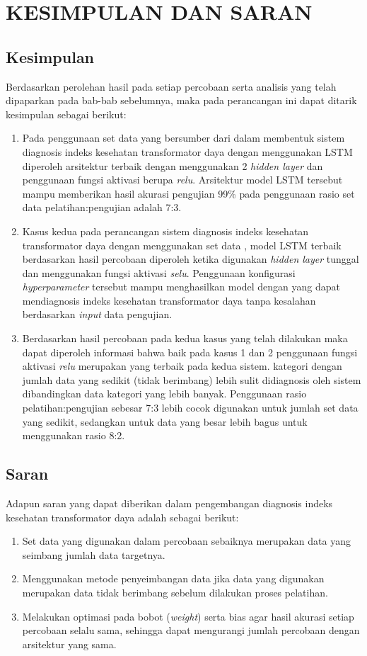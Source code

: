 \chapter{KESIMPULAN DAN SARAN}

\section{Kesimpulan}
Berdasarkan perolehan hasil pada setiap percobaan serta analisis yang telah dipaparkan pada bab-bab sebelumnya, maka pada perancangan ini dapat ditarik kesimpulan sebagai berikut:
\begin{enumerate}
	\item Pada penggunaan set data yang bersumber dari \cite{shah2016predict} dalam membentuk sistem diagnosis indeks kesehatan transformator daya dengan menggunakan LSTM diperoleh arsitektur terbaik dengan menggunakan 2 \textit{hidden layer} dan penggunaan fungsi aktivasi berupa \textit{relu}. Arsitektur model LSTM tersebut mampu memberikan hasil akurasi pengujian 99\% pada penggunaan rasio set data pelatihan:pengujian adalah 7:3.
	\item Kasus kedua pada perancangan sistem diagnosis indeks kesehatan transformator daya dengan menggunakan set data \cite{abu2012calculation}, model LSTM terbaik berdasarkan hasil percobaan diperoleh ketika digunakan \textit{hidden layer} tunggal dan menggunakan fungsi aktivasi \textit{selu}. Penggunaan konfigurasi \textit{hyperparameter} tersebut mampu menghasilkan model dengan yang dapat mendiagnosis indeks kesehatan transformator daya tanpa kesalahan berdasarkan \textit{input} data pengujian.
	\item Berdasarkan hasil percobaan pada kedua kasus yang telah dilakukan maka dapat diperoleh informasi bahwa baik pada kasus 1 dan 2 penggunaan fungsi aktivasi \textit{relu} merupakan yang terbaik pada kedua sistem. kategori dengan jumlah data yang sedikit (tidak berimbang) lebih sulit didiagnosis oleh sistem dibandingkan data kategori yang lebih banyak. Penggunaan rasio pelatihan:pengujian sebesar 7:3 lebih cocok digunakan untuk jumlah set data yang sedikit, sedangkan untuk data yang besar lebih bagus untuk menggunakan rasio 8:2.
\end{enumerate}

\section{Saran}
Adapun saran yang dapat diberikan dalam pengembangan diagnosis indeks kesehatan transformator daya adalah sebagai berikut:
\begin{enumerate}
	\item Set data yang digunakan dalam percobaan sebaiknya merupakan data yang seimbang jumlah data targetnya.
	\item Menggunakan metode penyeimbangan data jika data yang digunakan merupakan data tidak berimbang sebelum dilakukan proses pelatihan.
	\item Melakukan optimasi pada bobot (\textit{weight}) serta bias agar hasil akurasi setiap percobaan selalu sama, sehingga dapat mengurangi jumlah percobaan dengan arsitektur yang sama.
\end{enumerate}